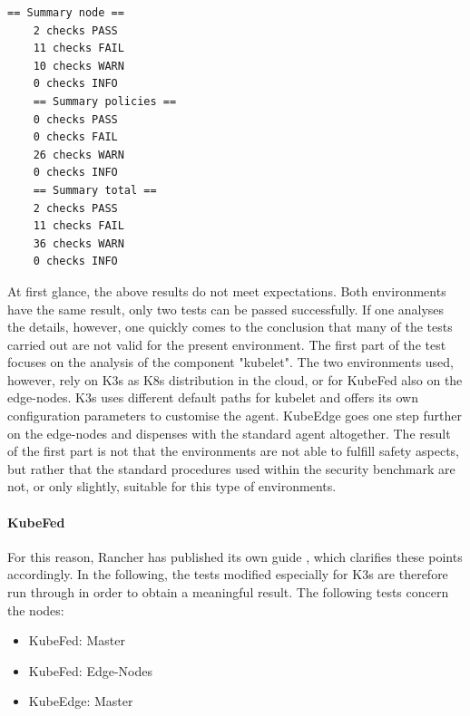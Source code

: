 \documentclass[MIC,Master,english]{twbook}%
\begin{document}
\vspace{\baselineskip}
\begin{center}
\begin{minipage}{.40\textwidth}
    \begin{lstlisting}[caption={KubeEdge \& KubeFed bench},captionpos=b]
    == Summary node ==
    2 checks PASS
    11 checks FAIL
    10 checks WARN
    0 checks INFO
    == Summary policies ==
    0 checks PASS
    0 checks FAIL
    26 checks WARN
    0 checks INFO
    == Summary total ==
    2 checks PASS
    11 checks FAIL
    36 checks WARN
    0 checks INFO
    \end{lstlisting}
\end{minipage}
\end{center}

At first glance, the above results do not meet expectations. Both environments have the same result, only two tests can be passed successfully. If one analyses the details, however, one quickly comes to the conclusion that many of the tests carried out are not valid for the present environment. The first part of the test focuses on the analysis of the component "kubelet". The two environments used, however, rely on K3s as \ac{K8s} distribution in the cloud, or for KubeFed also on the edge-nodes. K3s uses different default paths for kubelet and offers its own configuration parameters \cite{k3s-config} to customise the agent. KubeEdge goes one step further on the edge-nodes and dispenses with the standard agent altogether. The result of the first part is not that the environments are not able to fulfill safety aspects, but rather that the standard procedures used within the security benchmark are not, or only slightly, suitable for this type of environments. 

\paragraph{KubeFed} For this reason, Rancher has published its own guide \cite{k3s-assesment}, which clarifies these points accordingly. In the following, the tests modified especially for K3s are therefore run through in order to obtain a meaningful result. The following tests concern the nodes:

\begin{itemize}
    \itemsep0em
    \item KubeFed: Master
    \item KubeFed: Edge-Nodes
    \item KubeEdge: Master 
\end{itemize}
\end{document}
